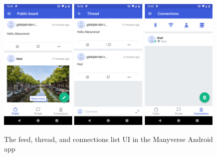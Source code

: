 \begin{figure}
    \centering
    \includegraphics[width=0.32\textwidth]{screens/ssb/feed}
    \includegraphics[width=0.32\textwidth]{screens/ssb/thread}
    \includegraphics[width=0.32\textwidth]{screens/ssb/connections}
    \caption{The feed, thread, and connections list UI in the Manyverse Android app}
    \label{manyverse}
\end{figure}


